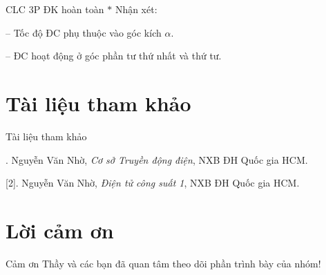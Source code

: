 \documentclass[24pt]{beamer}
\begin{document}
\begin{frame}{CLC 3P ĐK hoàn toàn}
	\justifying
	$\ast$ Nhận xét:
	
	-- Tốc độ ĐC phụ thuộc vào góc kích $\alpha$.
	
	-- ĐC hoạt động ở góc phần tư thứ nhất và thứ tư.		
\end{frame}

\section*{Tài liệu tham khảo}
\begin{frame}{Tài liệu tham khảo}
\begin{small}
\justifying
[1]. Nguyễn Văn Nhờ, \textit{Cơ sở Truyền động điện}, NXB ĐH Quốc gia HCM.

[2]. Nguyễn Văn Nhờ, \textit{Điện tử công suất 1}, NXB ĐH Quốc gia HCM.
\end{small}
\end{frame}
\section*{Lời cảm ơn}
\begin{frame}
\justifying
\large \alert{Cảm ơn Thầy và các bạn đã quan tâm theo dõi phần trình bày của nhóm!}
\end{frame}
\end{document}
